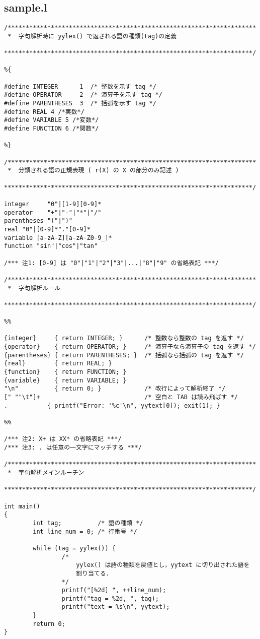 \documentclass[a4j]{jsarticle}  %
\begin{document}
\subsection{sample.l}
\begin{verbatim}
/*********************************************************************
 *  字句解析時に yylex() で返される語の種類(tag)の定義
 *********************************************************************/

%{

#define INTEGER      1  /* 整数を示す tag */
#define OPERATOR     2  /* 演算子を示す tag */
#define PARENTHESES  3  /* 括弧を示す tag */
#define REAL 4 /*実数*/
#define VARIABLE 5 /*変数*/
#define FUNCTION 6 /*関数*/

%}

/*********************************************************************
 *  分類される語の正規表現 ( r(X) の X の部分のみ記述 )
 *********************************************************************/

integer     "0"|[1-9][0-9]*
operator    "+"|"-"|"*"|"/"
parentheses "("|")"
real "0"|[0-9]*"."[0-9]*
variable [a-zA-Z][a-zA-Z0-9_]*
function "sin"|"cos"|"tan"

/*** 注1: [0-9] は "0"|"1"|"2"|"3"|...|"8"|"9" の省略表記 ***/

/*********************************************************************
 *  字句解析ルール
 *********************************************************************/

%%

{integer}     { return INTEGER; }      /* 整数なら整数の tag を返す */
{operator}    { return OPERATOR; }     /* 演算子なら演算子の tag を返す */
{parentheses} { return PARENTHESES; }  /* 括弧なら括弧の tag を返す */
{real}        { return REAL; }
{function}    { return FUNCTION; }
{variable}    { return VARIABLE; }
"\n"          { return 0; }            /* 改行によって解析終了 */
[" ""\t"]+                             /* 空白と TAB は読み飛ばす */
.           { printf("Error: '%c'\n", yytext[0]); exit(1); }

%%

/*** 注2: X+ は XX* の省略表記 ***/
/*** 注3: . は任意の一文字にマッチする ***/

/*********************************************************************
 *  字句解析メインルーチン
 *********************************************************************/

int main()
{
        int tag;          /* 語の種類 */
        int line_num = 0; /* 行番号 */

        while (tag = yylex()) {
                /*
                    yylex() は語の種類を戻値とし，yytext に切り出された語を
                    割り当てる．
                */
                printf("[%2d] ", ++line_num);
                printf("tag = %2d, ", tag);
                printf("text = %s\n", yytext);
        }
        return 0;
}
\end{verbatim}
\end{document}
